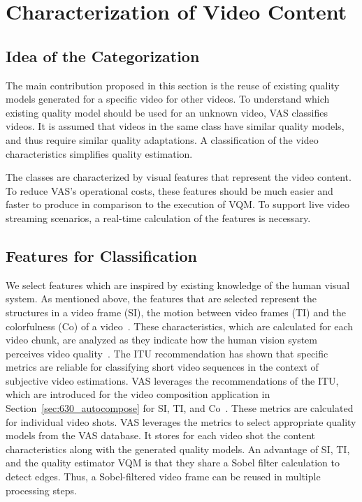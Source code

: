 \section{Characterization of Video Content}
 \label{sec:724_videoClassification}
\subsection{Idea of the Categorization}
The main contribution proposed in this section is the reuse of existing quality models generated for a specific video for other videos. 
To understand which existing quality model should be used for an unknown video, \ac{VAS} classifies videos.
It is assumed that videos in the same class have similar quality models, and thus require similar quality adaptations.
A classification of the video characteristics simplifies quality estimation.

The classes are characterized by visual features that represent the video content.
To reduce \ac{VAS}'s operational costs, these features should be much easier and faster to produce in comparison to the execution of \ac{VQM}. %
To support live video streaming scenarios, a real-time calculation of the features is necessary.
\subsection{Features for Classification}
 \label{sec:724_calculationSITI_Structures}
We select features which are inspired by existing knowledge of the human visual system.
As mentioned above, the features that are selected represent the structures in a video frame (\ac{SI}), the motion between video frames (\ac{TI}) and the colorfulness (\ac{Co}) of a video~\cite{ITU-J2008,Winkler2012}. 
These characteristics, which are calculated for each video chunk, are analyzed as they indicate how the human vision system perceives video quality~\cite{Winkler2012}. 
The \ac{ITU} recommendation has shown that specific metrics are reliable for classifying short video sequences in the context of subjective video estimations.
\ac{VAS} leverages the recommendations of the \ac{ITU}, which are introduced for the video composition application in Section~\ref{sec:630_autocompose} for \ac{SI}, \ac{TI}, and \ac{Co}~\cite{ITU-J2008}.
These metrics are calculated for individual video shots. %
\ac{VAS} leverages the metrics to select appropriate quality models from the \ac{VAS} database.
It stores for each video shot the content characteristics along with the generated quality models.
An advantage of \ac{SI}, \ac{TI}, and the quality estimator \ac{VQM} is that they share a Sobel filter calculation to detect edges.
Thus, a Sobel-filtered video frame can be reused in multiple processing steps.
